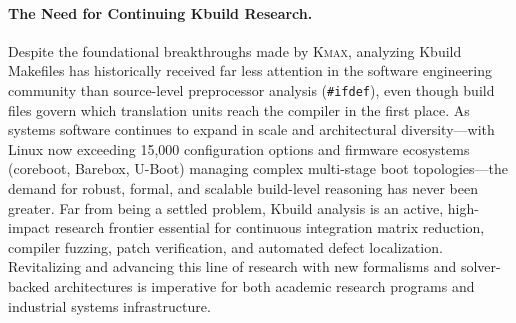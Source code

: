 \documentclass[acmsmall,screen,review]{acmart}
\begin{document}
\paragraph{The Need for Continuing Kbuild Research.}
Despite the foundational breakthroughs made by \textsc{Kmax}, analyzing Kbuild Makefiles has historically received far less attention in the software engineering community than source-level preprocessor analysis (\texttt{\#ifdef}), even though build files govern which translation units reach the compiler in the first place. As systems software continues to expand in scale and architectural diversity---with Linux now exceeding 15,000 configuration options and firmware ecosystems (coreboot, Barebox, U-Boot) managing complex multi-stage boot topologies---the demand for robust, formal, and scalable build-level reasoning has never been greater. Far from being a settled problem, Kbuild analysis is an active, high-impact research frontier essential for continuous integration matrix reduction, compiler fuzzing, patch verification, and automated defect localization. Revitalizing and advancing this line of research with new formalisms and solver-backed architectures is imperative for both academic research programs and industrial systems infrastructure.
\end{document}
